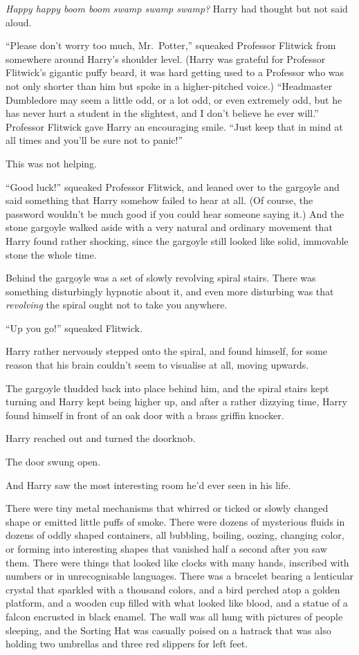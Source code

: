 \emph{Happy happy boom boom swamp swamp swamp?} Harry had thought but
not said aloud.

``Please don't worry too much, Mr.~Potter,'' squeaked Professor Flitwick
from somewhere around Harry's shoulder level. (Harry was grateful for
Professor Flitwick's gigantic puffy beard, it was hard getting used to a
Professor who was not only shorter than him but spoke in a
higher-pitched voice.) ``Headmaster Dumbledore may seem a little odd, or
a lot odd, or even extremely odd, but he has never hurt a student in the
slightest, and I don't believe he ever will.'' Professor Flitwick gave
Harry an encouraging smile. ``Just keep that in mind at all times and
you'll be sure not to panic!''

This was not helping.

``Good luck!'' squeaked Professor Flitwick, and leaned over to the
gargoyle and said something that Harry somehow failed to hear at all.
(Of course, the password wouldn't be much good if you could hear someone
saying it.) And the stone gargoyle walked aside with a very natural and
ordinary movement that Harry found rather shocking, since the gargoyle
still looked like solid, immovable stone the whole time.

Behind the gargoyle was a set of slowly revolving spiral stairs. There
was something disturbingly hypnotic about it, and even more disturbing
was that \emph{revolving} the spiral ought not to take you anywhere.

``Up you go!'' squeaked Flitwick.

Harry rather nervously stepped onto the spiral, and found himself, for
some reason that his brain couldn't seem to visualise at all, moving
upwards.

The gargoyle thudded back into place behind him, and the spiral stairs
kept turning and Harry kept being higher up, and after a rather dizzying
time, Harry found himself in front of an oak door with a brass griffin
knocker.

Harry reached out and turned the doorknob.

The door swung open.

And Harry saw the most interesting room he'd ever seen in his life.

There were tiny metal mechanisms that whirred or ticked or slowly
changed shape or emitted little puffs of smoke. There were dozens of
mysterious fluids in dozens of oddly shaped containers, all bubbling,
boiling, oozing, changing color, or forming into interesting shapes that
vanished half a second after you saw them. There were things that looked
like clocks with many hands, inscribed with numbers or in unrecognisable
languages. There was a bracelet bearing a lenticular crystal that
sparkled with a thousand colors, and a bird perched atop a golden
platform, and a wooden cup filled with what looked like blood, and a
statue of a falcon encrusted in black enamel. The wall was all hung with
pictures of people sleeping, and the Sorting Hat was casually poised on
a hatrack that was also holding two umbrellas and three red slippers for
left feet.


